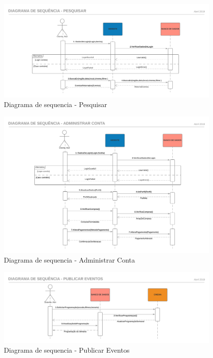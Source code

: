 \documentclass[12pt]{article}
\begin{document}
    \begin{figure}[h]
        \centering
        \includegraphics[scale=0.5]{./Imagens/DiagramasDeSequencia/DiagramaDeSequencia6.png}
        \caption{Diagrama de sequencia - Pesquisar}
        \label{fig:DiagramaSequencia06}
    \end{figure}
    \FloatBarrier

    \begin{figure}[h]
        \centering
        \includegraphics[scale=0.5]{./Imagens/DiagramasDeSequencia/DiagramaDeSequencia7.png}
        \caption{Diagrama de sequencia - Administrar Conta}
        \label{fig:DiagramaSequencia07}
    \end{figure}
    \FloatBarrier
    
    \begin{figure}[h]
        \centering
        \includegraphics[scale=0.5]{./Imagens/DiagramasDeSequencia/DiagramaDeSequencia8.png}
        \caption{Diagrama de sequencia - Publicar Eventos}
        \label{fig:DiagramaSequencia08}
    \end{figure}
    \FloatBarrier
    
\end{document}
